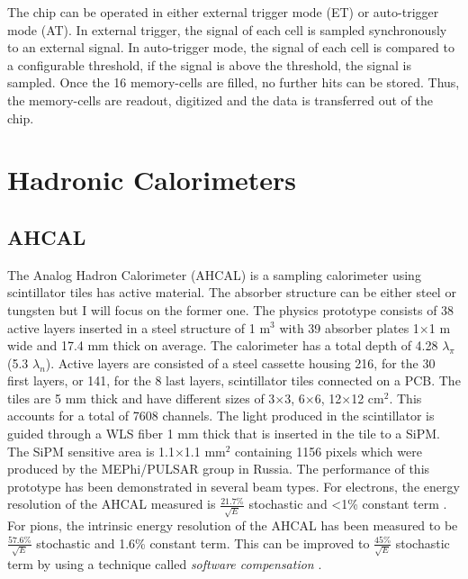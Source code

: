The chip can be operated in either external trigger mode (ET) or auto-trigger mode (AT). In external trigger, the signal of each cell is sampled synchronously to an external signal. In auto-trigger mode, the signal of each cell is compared to a configurable threshold, if the signal is above the threshold, the signal is sampled. Once the 16 memory-cells are filled, no further hits can be stored. Thus, the memory-cells are readout, digitized and the data is transferred out of the chip.

\section{Hadronic Calorimeters}

\subsection{AHCAL}
\label{subsec:SPIROC2B}

The Analog Hadron Calorimeter (AHCAL) is a sampling calorimeter using scintillator tiles has active material. The absorber structure can be either steel or tungsten but I will focus on the former one. The physics prototype consists of 38 active layers inserted in a steel structure of 1 m$^3$ with 39 absorber plates 1$\times$1 m wide and 17.4 mm thick on average. The calorimeter has a total depth of 4.28 $\lambda_{\pi}$ (5.3 $\lambda_{n}$). Active layers are consisted of a steel cassette housing 216, for the 30 first layers, or 141, for the 8 last layers, scintillator tiles connected on a PCB. The tiles are 5 mm thick and have different sizes of 3$\times$3, 6$\times$6, 12$\times$12 cm$^2$. This accounts for a total of 7608 channels. The light produced in the scintillator is guided through a WLS fiber 1 mm thick that is inserted in the tile to a SiPM. The SiPM sensitive area is 1.1$\times$1.1 mm$^2$ containing 1156 pixels which were produced by the MEPhi/PULSAR group in Russia. The performance of this prototype has been demonstrated in several beam types. For electrons, the energy resolution of the AHCAL measured is $\frac{21.7\%}{\sqrt{E}}$ stochastic and <1\% constant term \cite{CAN034}. For pions, the intrinsic energy resolution of the AHCAL has been measured to be $\frac{57.6\%}{\sqrt{E}}$ stochastic and 1.6\% constant term. This can be improved to $\frac{45\%}{\sqrt{E}}$ stochastic term by using a technique called \textit{software compensation} \cite{SoftCompNew2012}.

